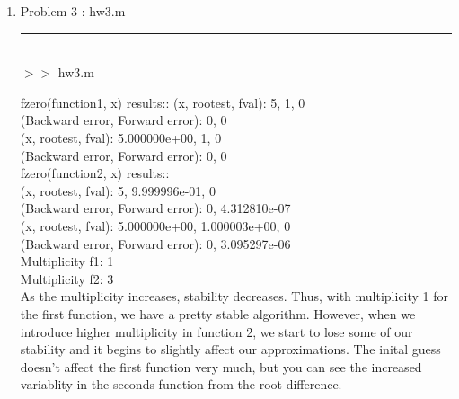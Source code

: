 \documentclass[12pt]{article}
\begin{document}
	\begin{enumerate}
	\item[] Problem 3 : hw3.m \noindent\rule{\textwidth}{1.0pt} \\
		
	
	\pagebreak
	$>>$ hw3.m
	\begin{framed}
		fzero(function1, x) results::
(x, rootest, fval): 5, 1, 0\\
(Backward error, Forward error): 0, 0\\
(x, rootest, fval): 5.000000e+00, 1, 0\\
(Backward error, Forward error): 0, 0\\ 

fzero(function2, x) results::\\
(x, rootest, fval): 5, 9.999996e-01, 0\\
(Backward error, Forward error): 0, 4.312810e-07\\
(x, rootest, fval): 5.000000e+00, 1.000003e+00, 0\\
(Backward error, Forward error): 0, 3.095297e-06\\

Multiplicity f1: 1\\
Multiplicity f2: 3\\
As the multiplicity increases, stability decreases.
 Thus, with multiplicity 1 for the first function, we
 have a pretty stable algorithm. However, when we 
 introduce higher multiplicity in function 2, we start to 
 lose some of our stability and it begins to slightly affect 
 our approximations. The inital guess doesn't affect the first 
 function very much, but you can see the increased variablity in 
 the seconds function from the root difference.
	\end{framed}	
	
	\end{enumerate}
\end{document}
